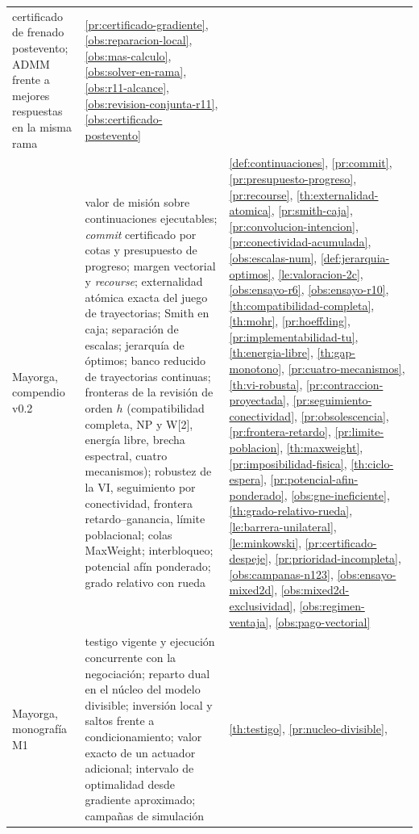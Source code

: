\begin{table}[!ht]
\begin{tabularx}{\textwidth}{@{}p{4.6cm}p{3.5cm}X@{}}
    certificado de frenado postevento; ADMM frente a mejores respuestas en la
    misma rama
  & \cref{pr:certificado-gradiente}, \cref{obs:reparacion-local}, \cref{obs:mas-calculo},
    \cref{obs:solver-en-rama}, \cref{obs:r11-alcance}, \cref{obs:revision-conjunta-r11},
    \cref{obs:certificado-postevento} \\
Mayorga, compendio v0.2 \cite{mayorga2026compendio}
  & valor de misión sobre continuaciones ejecutables; \emph{commit} certificado por
    cotas y presupuesto de progreso; margen vectorial y \emph{recourse}; externalidad
    atómica exacta del juego de trayectorias; Smith en caja; separación de escalas;
    jerarquía de óptimos; banco reducido de trayectorias continuas; fronteras de la
    revisión de orden $h$ (compatibilidad completa, NP y W[2], energía libre, brecha
    espectral, cuatro mecanismos); robustez de la VI, seguimiento por conectividad,
    frontera retardo--ganancia, límite poblacional; colas MaxWeight; interbloqueo;
    potencial afín ponderado; grado relativo con rueda
  & \cref{def:continuaciones}, \cref{pr:commit}, \cref{pr:presupuesto-progreso},
    \cref{pr:recourse}, \cref{th:externalidad-atomica}, \cref{pr:smith-caja},
    \cref{pr:convolucion-intencion}, \cref{pr:conectividad-acumulada},
    \cref{obs:escalas-num}, \cref{def:jerarquia-optimos}, \cref{le:valoracion-2c},
    \cref{obs:ensayo-r6}, \cref{obs:ensayo-r10},
    \cref{th:compatibilidad-completa}, \cref{th:mohr}, \cref{pr:hoeffding}, \cref{pr:implementabilidad-tu}, \cref{th:energia-libre}, \cref{th:gap-monotono}, \cref{pr:cuatro-mecanismos}, \cref{th:vi-robusta}, \cref{pr:contraccion-proyectada}, \cref{pr:seguimiento-conectividad}, \cref{pr:obsolescencia}, \cref{pr:frontera-retardo}, \cref{pr:limite-poblacion}, \cref{th:maxweight}, \cref{pr:imposibilidad-fisica}, \cref{th:ciclo-espera}, \cref{pr:potencial-afin-ponderado}, \cref{obs:gne-ineficiente}, \cref{th:grado-relativo-rueda}, \cref{le:barrera-unilateral}, \cref{le:minkowski},
    \cref{pr:certificado-despeje}, \cref{pr:prioridad-incompleta}, \cref{obs:campanas-n123},
    \cref{obs:ensayo-mixed2d}, \cref{obs:mixed2d-exclusividad}, \cref{obs:regimen-ventaja},
    \cref{obs:pago-vectorial} \\
Mayorga, monografía M1 \cite{mayorga2026m1}
  & testigo vigente y ejecución concurrente con la negociación; reparto dual
    en el núcleo del modelo divisible; inversión local y saltos frente a
    condicionamiento; valor exacto de un actuador adicional; intervalo de
    optimalidad desde gradiente aproximado; campañas de simulación
  & \cref{th:testigo}, \cref{pr:nucleo-divisible},

\end{tabularx}
\end{table}
